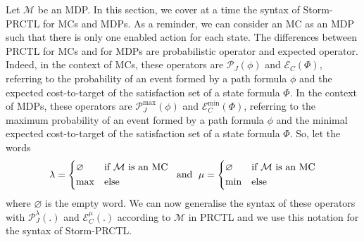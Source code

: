 \begin{notation}
  Let $\mathcal{M}$ be an MDP. In this section, we cover at a time the syntax of Storm-PRCTL for MCs and MDPs.
  As a reminder, we can consider an MC as an MDP such that there is only one enabled action for each state.
  The differences between PRCTL for MCs and for MDPs are probabilistic operator and expected operator.
  Indeed, in the context of MCs, these operators are $\mathcal{P}_J(\phi)$ and $\mathcal{E}_C(\Phi)$, referring to the probability of an event formed by a path formula $\phi$ and the expected cost-to-target of the satisfaction set of a state formula $\Phi$.
  In the context of MDPs, these operators are $\mathcal{P}^{\max}_J(\phi)$ and $\mathcal{E}^{\min}_C(\Phi)$, referring to the maximum probability of an event formed by a path formula $\phi$ and the minimal expected cost-to-target of the satisfaction set of a state formula $\Phi$.
  So, let the words
  \[\lambda = \begin{dcases*}
    \varnothing &if $\mathcal{M}$ is an MC\\
    \max & else
  \end{dcases*} \;\text{ and }\;
  \mu = \begin{dcases*}
    \varnothing &if  $\mathcal{M}$ is an MC\\
    \min & else
  \end{dcases*}\]
  where $\varnothing$ is the empty word.
  We can now generalise the syntax of these operators with $\mathcal{P}^\lambda_J(.)$ and $\mathcal{E}^\mu_C(.)$ according to $\mathcal{M}$ in PRCTL and we use this notation for the syntax of Storm-PRCTL.
\end{notation}

